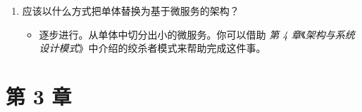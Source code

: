 \begin{enumerate}
\begin{itemize}
\item 层（layer）是逻辑上的，规定你如何组织代码。层级（tier）是物理上的，规定你如何运行代码。每个层级都必须与其他层级分离，要么运行在不同的进程中，要么甚至运行在不同的机器上。
\end{itemize}
\item 应该以什么方式把单体替换为基于微服务的架构？

\begin{itemize}
\item 逐步进行。从单体中切分出小的微服务。你可以借助 \emph{第 4 章}《\emph{架构与系统设计模式}》中介绍的绞杀者模式来帮助完成这件事。
\end{itemize}
\end{enumerate}

\section*{第 3 章}

